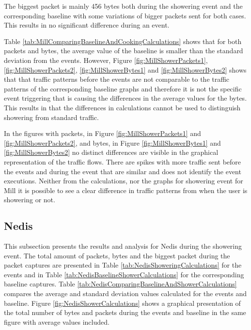 The biggest packet is mainly 456 bytes both during the showering event and the corresponding baseline with some variations of bigger packets sent for both cases. This results in no significant difference during an event. 

Table \ref{tab:MillComparingBaselineAndCookingCalculations} shows that for both packets and bytes, the average value of the baseline is smaller than the standard deviation from the events. However, Figure \ref{fig:MillShowerPackets1}, \ref{fig:MillShowerPackets2}, \ref{fig:MillShowerBytes1} and \ref{fig:MillShowerBytes2} shows that that traffic patterns before the events are not comparable to the traffic patterns of the corresponding baseline graphs and therefore it is not the specific event triggering that is causing the differences in the average values for the bytes. This results in that the differences in calculations cannot be used to distinguish showering from standard traffic.

In the figures with packets, in Figure \ref{fig:MillShowerPackets1} and \ref{fig:MillShowerPackets2}, and bytes, in Figure \ref{fig:MillShowerBytes1} and \ref{fig:MillShowerBytes2} no distinct differences are visible in the graphical representation of the traffic flows. There are spikes with more traffic sent before the events and during the event that are similar and does not identify the event executions. Neither from the calculations, nor the graphs for showering event for Mill it is possible to see a clear difference in traffic patterns from when the user is showering or not. 

\newpage
\subsection{Nedis}
This subsection presents the results and analysis for Nedis during the showering event. The total amount of packets, bytes and the biggest packet during the packet captures are presented in Table \ref{tab:NedisShoweringCalculations} for the events and in Table \ref{tab:NedisBaselineShowerCalculations} for the corresponding baseline captures. Table \ref{tab:NedisComparingBaselineAndShowerCalculations} compares the average and standard deviation values calculated for the events and baseline. Figure \ref{fig:NedisShowerCalculations} shows a graphical presentation of the total number of bytes and packets during the events and baseline in the same figure with average values included.


